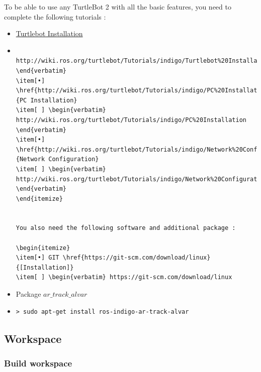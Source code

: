 \documentclass[10pt,a4paper]{article}
\begin{document}
To be able to use any TurtleBot 2 with all the basic features, you need to complete the following tutorials :

\begin{itemize}
\item[•] \href{http://wiki.ros.org/turtlebot/Tutorials/indigo/Turtlebot%20Installation}{Turtlebot Installation} 
\item[ ] \begin{verbatim} http://wiki.ros.org/turtlebot/Tutorials/indigo/Turtlebot%20Installation \end{verbatim}
\item[•] \href{http://wiki.ros.org/turtlebot/Tutorials/indigo/PC%20Installation}{PC Installation} 
\item[ ] \begin{verbatim} http://wiki.ros.org/turtlebot/Tutorials/indigo/PC%20Installation \end{verbatim}
\item[•] \href{http://wiki.ros.org/turtlebot/Tutorials/indigo/Network%20Configuration}{Network Configuration} 
\item[ ] \begin{verbatim} http://wiki.ros.org/turtlebot/Tutorials/indigo/Network%20Configuration \end{verbatim}
\end{itemize}


You also need the following software and additional package :

\begin{itemize}
\item[•] GIT \href{https://git-scm.com/download/linux}{[Installation]} 
\item[ ] \begin{verbatim} https://git-scm.com/download/linux \end{verbatim}
\item[•] Package $ar\_track\_alvar$ 
\item[ ] \begin{verbatim}> sudo apt-get install ros-indigo-ar-track-alvar \end{verbatim}
\end{itemize}

\subsection{Workspace}
\label{sec:workspace}

\subsubsection{Build workspace}
\end{document}
